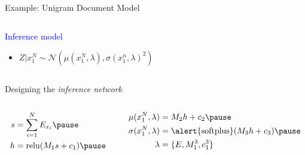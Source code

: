 \documentclass[14pt]{beamer}
\begin{document}
\begin{frame}{Example: Unigram Document Model}


\begin{columns}
	\begin{column}{0.75\textwidth}  
   		\textcolor{blue}{Inference model}
		\begin{itemize}
			\item $Z|x_1^N \sim \mathcal N(\mu(x_1^N, \lambda), \sigma(x_1^n, \lambda)^2)$
		\end{itemize}
    \end{column}
	\begin{column}{0.2\textwidth}
    \end{column}    
    \end{columns}
    \pause
    
    Designing the \emph{inference network}\pause
    \vspace{-10pt}
    \begin{columns}
    \begin{column}{0.35\textwidth}
    \begin{equation*}
	\begin{aligned}		
		s &= \sum_{i=1}^N E_{x_i} \pause \\
		h &= \relu(M_1s+c_1)  \pause 		
	\end{aligned}
	\end{equation*}
	\end{column}
	\begin{column}{0.6\textwidth}
	\begin{equation*}
	\begin{aligned}		
		\mu(x_1^N, \lambda) &= M_2h + c_2  \pause \\
		\sigma(x_1^N, \lambda) &= \alert{\softplus}(M_3h + c_3)  \pause \\
		\lambda &= \{E, M_1^3, c_1^3\}
	\end{aligned}
	\end{equation*}
	\end{column}
	\end{columns}
	

\end{frame}
\end{document}
